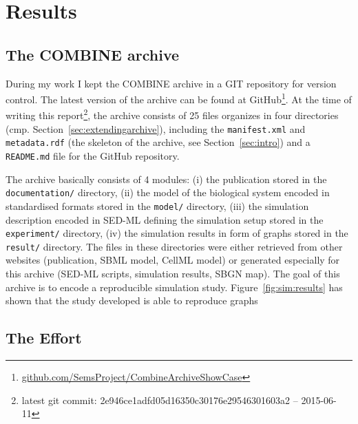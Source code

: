 
\section{Results}

\subsection{The COMBINE archive}
During my work I kept the COMBINE archive in a GIT repository for version control.
The latest version of the archive can be found at GitHub\footnote{\href{https://github.com/SemsProject/CombineArchiveShowCase}{github.com/SemsProject/CombineArchiveShowCase}}.
At the time of writing this report\footnote{latest git commit: 2e946ce1adfd05d16350c30176e29546301603a2 -- 2015-06-11}, the archive consists of 25 files organizes in four directories (cmp. Section~\ref{sec:extendingarchive}), including the \texttt{manifest.xml} and \texttt{metadata.rdf} (the skeleton of the archive, see Section~\ref{sec:intro}) and a \texttt{README.md} file for the GitHub repository.

The archive basically consists of 4 modules: (i) the publication stored in the \texttt{documentation/} directory, (ii) the model of the biological system encoded in standardised formats stored in the \texttt{model/} directory, (iii) the simulation description encoded in SED-ML defining the simulation setup stored in the \texttt{experiment/} directory, (iv) the simulation results in form of graphs stored in the \texttt{result/} directory.
The files in these directories were either retrieved from other websites (publication, SBML model, CellML model) or generated especially for this archive (SED-ML scripts, simulation results, SBGN map).
The goal of this archive is to encode a reproducible simulation study.
Figure~\ref{fig:sim:results} has shown that the study developed is able to reproduce graphs 



\subsection{The Effort}




